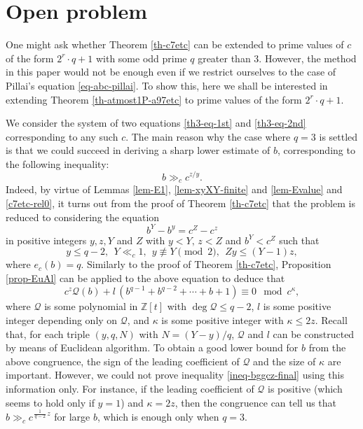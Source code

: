 \documentclass[11pt]{amsart}
\numberwithin{equation}{section}
\begin{document}
\section{Open problem} \label{sec-10}

One might ask whether Theorem \ref{th-c7etc} can be extended to prime values of $c$ of the form $2^r \cdot q+1$ with some odd prime $q$ greater than $3$.
However, the method in this paper would not be enough even if we restrict ourselves to the case of Pillai's equation \eqref{eq-abc-pillai}.
To show this, here we shall be interested in extending Theorem \ref{th-atmost1P-a97etc} to prime values of the form $2^r \cdot q + 1$.

We consider the system of two equations \eqref{th3-eq-1st} and \eqref{th3-eq-2nd} corresponding to any such $c$.
The main reason why the case where $q=3$ is settled is that we could succeed in deriving a sharp lower estimate of $b$, corresponding to the following inequality:
\begin{equation} \label{ineq-bggcz-final}
b \gg_{c} c^{z/y}.
\end{equation}
Indeed, by virtue of Lemmas \ref{lem-E1}, \ref{lem-xyXY-finite} and \ref{lem-Evalue} and \eqref{c7etc-rel0}, it turns out from the proof of Theorem \ref{th-c7etc} that the problem is reduced to considering the equation
\begin{equation} \label{eq-bYycZz-final}
b^Y-b^y=c^Z-c^z
\end{equation}
in positive integers $y,z,Y$ and $Z$ with $y<Y,\,z<Z$ and $b^Y<c^Z$ such that 
\[
y \le q-2, \ \ Y \ll_{c}1, \ \ y \not\equiv Y \pmod{2}, \ \ Z y \le (Y-1)z,
\]
where $e_{c}(b)=q$.
Similarly to the proof of Theorem \ref{th-c7etc}, Proposition \ref{prop-EuAl} can be applied to the above equation to deduce that
\[
c^z \mathcal Q(b)+l\,(b^{q-1}+b^{q-2}+ \cdots +b+1) \equiv 0 \mod{c^\kappa},
\]
where $\mathcal Q$ is some polynomial in $\mathbb Z[t]$ with $\deg \mathcal Q \le q-2$, $l$ is some positive integer depending only on $\mathcal Q$, and $\kappa$ is some positive integer with $\kappa \le 2z$.
Recall that, for each triple $(y,q,N)$ with $N=(Y-y)/q$, $\mathcal Q$ and $l$ can be constructed by means of Euclidean algorithm.
To obtain a good lower bound for $b$ from the above congruence, the sign of the leading coefficient of $\mathcal Q$ and the size of $\kappa$ are important. 
However, we could not prove inequality \eqref{ineq-bggcz-final} using this information only.
For instance, if the leading coefficient of $\mathcal Q$ is positive (which seems to hold only if $y=1$) and $\kappa=2z$, then the congruence can tell us that $b \gg_{c} c^{\,\frac{1}{q-2}\,z}$ for large $b$, which is enough only when $q=3$.
\end{document}
